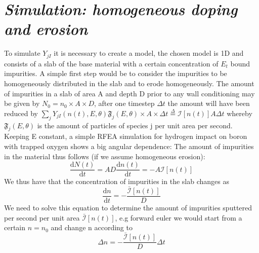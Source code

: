 \documentclass{article}
\begin{document}
\section*{\textit{Simulation: homogeneous doping and erosion}} 
To simulate $Y_{jI}$ it is necessary to create a model, the chosen model is 1D
and consists of a slab of the base material with a certain concentration of
$E_t$ bound impurities. A simple first step would be to consider the impurities
to be homogeneously distributed in the slab and to erode homogeneously.
The amount of impurities in a slab of area A and depth D prior to any 
wall conditioning may be given by
$N_0 = n_0\times A \times D$, after one timestep $\Delta t$ the amount will have been reduced
by $\sum_jY_{jI}(n(t),E,\theta)\mathfrak{F}_j(E,\theta)\times A\times\Delta t\stackrel{\Delta}{=}\mathcal{I}[n(t)]A\Delta t $ 
whereby $\mathfrak{F}_j(E,\theta)$ is the amount of particles of species j per unit area per second.
Keeping E constant, a simple RFEA simulation for hydrogen impact on boron with trapped oxygen
shows a big angular dependence:
The amount of impurities in the material thus follows (if we assume homogeneous erosion):
\begin{equation}
    \frac{\text{d}N(t)}{\text{d}t} = AD\frac{\text{d}n(t)}{\text{d}t} = -A\mathcal{I}[n(t)]
\end{equation}
We thus have that the concentration of impurities in the slab changes as 
\begin{equation}
    \frac{\text{d} n}{\text{d} t} = -\frac{\bar{\mathcal{I}}[n(t)]}{D}
\end{equation}
We need to solve this equation to determine the amount of impurities sputtered per second per unit area
$\bar{\mathcal{I}}[n(t)]$, e.g forward euler we would start from a certain $n = n_0$ and change n according
to
\begin{equation}
    \Delta n = -\frac{\bar{\mathcal{I}}[n(t)]}{D}\Delta t
\end{equation}
\end{document}
